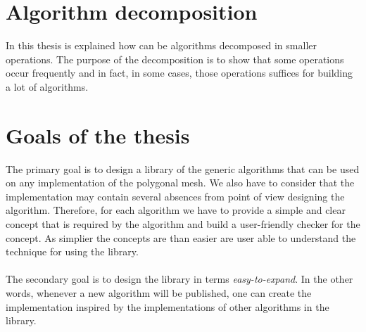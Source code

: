 \section{Algorithm decomposition}

In this thesis is explained how can be algorithms decomposed in smaller operations.
The purpose of the decomposition is to show that some operations occur frequently
and in fact, in some cases, those operations suffices for building a lot of algorithms.

\section{Goals of the thesis}

The primary goal is to design a library of the generic algorithms that can be used on any
implementation of the polygonal mesh. We also have to consider that the implementation
may contain several absences from point of view designing the algorithm. Therefore, for each
algorithm we have to provide a simple and clear concept that is required by the algorithm
and build a user-friendly checker for the concept. As simplier the concepts are than easier
are user able to understand the technique for using the library.\\
\\
The secondary goal is to design the library in terms \emph{easy-to-expand}. In the other words,
whenever a new algorithm will be published, one can create the implementation inspired
by the implementations of other algorithms in the library.